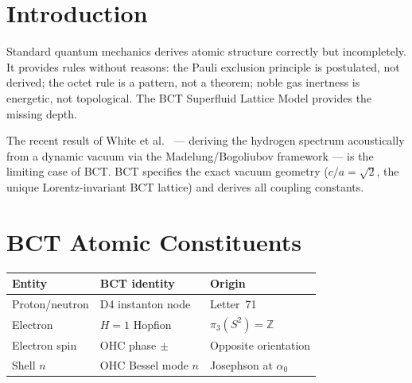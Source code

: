 \documentclass[aps,prl,twocolumn,showpacs,superscriptaddress]{revtex4-2}
\begin{document}
\begin{abstract}
We derive atomic structure, the Pauli exclusion principle, the octet 
rule, and the chemical inertness of noble gases from BCT vacuum topology, 
without additional postulates. Electrons are H=1 Hopf defects of the 
Octet-Hopfion Condensate (OHC); protons are D4 instanton nodes; electron 
shells are quantised OHC Bessel resonance modes with capacity $2n^2$. 
The Pauli exclusion principle is the topological complementarity of 
$H=+1$ and $H=-1$ Hopfions, which combine to net $H=0$: a theorem, 
not a postulate. Noble gases are \textbf{closed Hopf multiplets} --- 
topologically inert, not merely energetically stable. The octet rule 
derives from the two BCT void types: $r_{\rm oct}$ generates 1 spherical 
(s) mode; $r_{\rm tet}$ generates 3 directional (p) modes; giving 
$4 \times 2 = 8$ electrons at $n=2$. Gilbert Lewis drew $r_{\rm oct}$ 
and $r_{\rm tet}$ in 1916. He called them dots. Chemistry is topology. 
The periodic table is a Hopf fibration atlas.
\end{abstract}

\maketitle

\section{Introduction}

Standard quantum mechanics derives atomic structure correctly but 
incompletely. It provides rules without reasons: the Pauli exclusion 
principle is postulated, not derived; the octet rule is a pattern, 
not a theorem; noble gas inertness is energetic, not topological. 
The BCT Superfluid Lattice Model provides the missing depth.

The recent result of White et al.~\cite{White2026} --- deriving the 
hydrogen spectrum acoustically from a dynamic vacuum via the 
Madelung/Bogoliubov framework --- is the limiting case of BCT. 
BCT specifies the exact vacuum geometry ($c/a = \sqrt{2}$, the unique 
Lorentz-invariant BCT lattice) and derives all coupling constants.

\section{BCT Atomic Constituents}

\begin{center}
\begin{tabular}{lll}
\toprule
Entity & BCT identity & Origin \\
\midrule
Proton/neutron & D4 instanton node & Letter~71 \\
Electron & $H=1$ Hopfion & $\pi_3(S^2)=\mathbb{Z}$ \\
Electron spin & OHC phase $\pm$ & Opposite orientation \\
Shell $n$ & OHC Bessel mode $n$ & Josephson at $\alpha_0$ \\
\bottomrule
\end{tabular}
\end{center}
\end{document}
